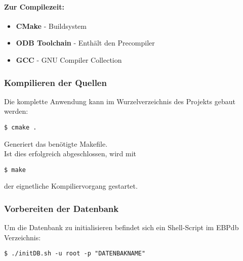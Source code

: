 \paragraph{Zur Compilezeit:}
\begin{itemize}
	\item \textbf{CMake} - Buildsystem
	\item \textbf{ODB Toolchain} - Enthält den Precompiler
	\item \textbf{GCC} - GNU Compiler Collection
\end{itemize}
\subsubsection{Kompilieren der Quellen}
Die komplette Anwendung kann im Wurzelverzeichnis des Projekts gebaut werden:\\
\begin{lstlisting}
$ cmake .
\end{lstlisting}
Generiert das benötigte Makefile.\\
Ist dies erfolgreich abgeschlossen, wird mit\\
\begin{lstlisting}
$ make
\end{lstlisting}
der eignetliche Kompiliervorgang gestartet.\\
\subsubsection{Vorbereiten der Datenbank}
Um die Datenbank zu initialisieren befindet sich ein Shell-Script im EBPdb Verzeichnis:\\
\begin{lstlisting}
$ ./initDB.sh -u root -p "DATENBAKNAME"
\end{lstlisting}
